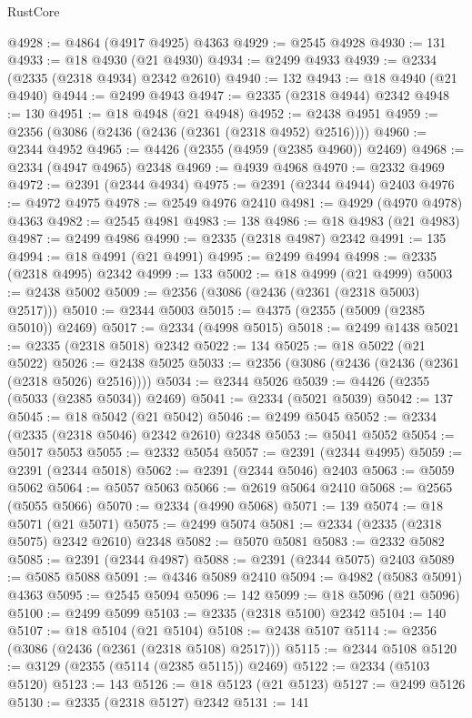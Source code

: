 \begin{lexlean}{RustCore}
\begin{coremodule}
@4928 := @4864 (@4917 @4925) @4363
@4929 := @2545 @4928
@4930 := 131
@4933 := @18 @4930 (@21 @4930)
@4934 := @2499 @4933
@4939 := @2334 (@2335 (@2318 @4934) @2342 @2610)
@4940 := 132
@4943 := @18 @4940 (@21 @4940)
@4944 := @2499 @4943
@4947 := @2335 (@2318 @4944) @2342
@4948 := 130
@4951 := @18 @4948 (@21 @4948)
@4952 := @2438 @4951
@4959 := @2356 (@3086 (@2436 (@2436 (@2361 (@2318 @4952) @2516))))
@4960 := @2344 @4952
@4965 := @4426 (@2355 (@4959 (@2385 @4960)) @2469)
@4968 := @2334 (@4947 @4965) @2348
@4969 := @4939 @4968
@4970 := @2332 @4969
@4972 := @2391 (@2344 @4934)
@4975 := @2391 (@2344 @4944) @2403
@4976 := @4972 @4975
@4978 := @2549 @4976 @2410
@4981 := @4929 (@4970 @4978) @4363
@4982 := @2545 @4981
@4983 := 138
@4986 := @18 @4983 (@21 @4983)
@4987 := @2499 @4986
@4990 := @2335 (@2318 @4987) @2342
@4991 := 135
@4994 := @18 @4991 (@21 @4991)
@4995 := @2499 @4994
@4998 := @2335 (@2318 @4995) @2342
@4999 := 133
@5002 := @18 @4999 (@21 @4999)
@5003 := @2438 @5002
@5009 := @2356 (@3086 (@2436 (@2361 (@2318 @5003) @2517)))
@5010 := @2344 @5003
@5015 := @4375 (@2355 (@5009 (@2385 @5010)) @2469)
@5017 := @2334 (@4998 @5015)
@5018 := @2499 @1438
@5021 := @2335 (@2318 @5018) @2342
@5022 := 134
@5025 := @18 @5022 (@21 @5022)
@5026 := @2438 @5025
@5033 := @2356 (@3086 (@2436 (@2436 (@2361 (@2318 @5026) @2516))))
@5034 := @2344 @5026
@5039 := @4426 (@2355 (@5033 (@2385 @5034)) @2469)
@5041 := @2334 (@5021 @5039)
@5042 := 137
@5045 := @18 @5042 (@21 @5042)
@5046 := @2499 @5045
@5052 := @2334 (@2335 (@2318 @5046) @2342 @2610) @2348
@5053 := @5041 @5052
@5054 := @5017 @5053
@5055 := @2332 @5054
@5057 := @2391 (@2344 @4995)
@5059 := @2391 (@2344 @5018)
@5062 := @2391 (@2344 @5046) @2403
@5063 := @5059 @5062
@5064 := @5057 @5063
@5066 := @2619 @5064 @2410
@5068 := @2565 (@5055 @5066)
@5070 := @2334 (@4990 @5068)
@5071 := 139
@5074 := @18 @5071 (@21 @5071)
@5075 := @2499 @5074
@5081 := @2334 (@2335 (@2318 @5075) @2342 @2610) @2348
@5082 := @5070 @5081
@5083 := @2332 @5082
@5085 := @2391 (@2344 @4987)
@5088 := @2391 (@2344 @5075) @2403
@5089 := @5085 @5088
@5091 := @4346 @5089 @2410
@5094 := @4982 (@5083 @5091) @4363
@5095 := @2545 @5094
@5096 := 142
@5099 := @18 @5096 (@21 @5096)
@5100 := @2499 @5099
@5103 := @2335 (@2318 @5100) @2342
@5104 := 140
@5107 := @18 @5104 (@21 @5104)
@5108 := @2438 @5107
@5114 := @2356 (@3086 (@2436 (@2361 (@2318 @5108) @2517)))
@5115 := @2344 @5108
@5120 := @3129 (@2355 (@5114 (@2385 @5115)) @2469)
@5122 := @2334 (@5103 @5120)
@5123 := 143
@5126 := @18 @5123 (@21 @5123)
@5127 := @2499 @5126
@5130 := @2335 (@2318 @5127) @2342
@5131 := 141

\end{coremodule}
\end{lexlean}

